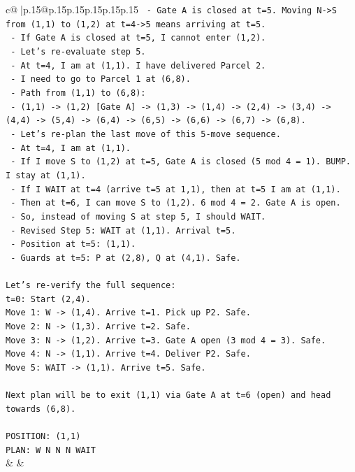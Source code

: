 \documentclass{article}
\begin{document}
{\begin{supertabular}{c@{$\;$}|p{.15\linewidth}@{}p{.15\linewidth}p{.15\linewidth}p{.15\linewidth}p{.15\linewidth}p{.15\linewidth}}
{{{\texttt{   {-} Gate A is closed at t=5. Moving N{-}>S from (1,1) to (1,2) at t=4{-}>5 means arriving at t=5.} \\
\texttt{   {-} If Gate A is closed at t=5, I cannot enter (1,2).} \\
\texttt{   {-} Let's re{-}evaluate step 5.} \\
\texttt{   {-} At t=4, I am at (1,1). I have delivered Parcel 2.} \\
\texttt{   {-} I need to go to Parcel 1 at (6,8).} \\
\texttt{   {-} Path from (1,1) to (6,8):} \\
\texttt{     {-} (1,1) {-}> (1,2) {[}Gate A{]} {-}> (1,3) {-}> (1,4) {-}> (2,4) {-}> (3,4) {-}> (4,4) {-}> (5,4) {-}> (6,4) {-}> (6,5) {-}> (6,6) {-}> (6,7) {-}> (6,8).} \\
\texttt{   {-} Let's re{-}plan the last move of this 5{-}move sequence.} \\
\texttt{   {-} At t=4, I am at (1,1).} \\
\texttt{   {-} If I move S to (1,2) at t=5, Gate A is closed (5 mod 4 = 1). BUMP. I stay at (1,1).} \\
\texttt{   {-} If I WAIT at t=4 (arrive t=5 at 1,1), then at t=5 I am at (1,1).} \\
\texttt{   {-} Then at t=6, I can move S to (1,2). 6 mod 4 = 2. Gate A is open.} \\
\texttt{   {-} So, instead of moving S at step 5, I should WAIT.} \\
\texttt{   {-} Revised Step 5: WAIT at (1,1). Arrival t=5.} \\
\texttt{   {-} Position at t=5: (1,1).} \\
\texttt{   {-} Guards at t=5: P at (2,8), Q at (4,1). Safe.} \\
\\ 
\texttt{Let's re{-}verify the full sequence:} \\
\texttt{t=0: Start (2,4).} \\
\texttt{Move 1: W {-}> (1,4). Arrive t=1. Pick up P2. Safe.} \\
\texttt{Move 2: N {-}> (1,3). Arrive t=2. Safe.} \\
\texttt{Move 3: N {-}> (1,2). Arrive t=3. Gate A open (3 mod 4 = 3). Safe.} \\
\texttt{Move 4: N {-}> (1,1). Arrive t=4. Deliver P2. Safe.} \\
\texttt{Move 5: WAIT {-}> (1,1). Arrive t=5. Safe.} \\
\\ 
\texttt{Next plan will be to exit (1,1) via Gate A at t=6 (open) and head towards (6,8).} \\
\\ 
\texttt{POSITION: (1,1)} \\
\texttt{PLAN: W N N N WAIT} \\
            }
        }
    }
    & & \\ \\


\end{supertabular}}
\end{document}
